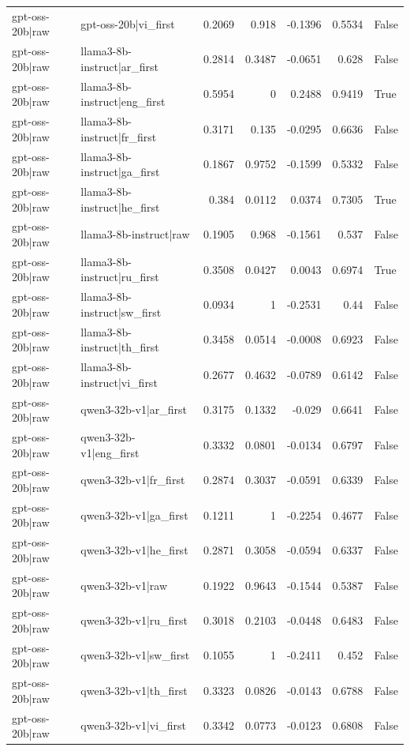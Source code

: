 \begin{table}
\begin{tabular}{l l r r r r l}
gpt-oss-20b|raw & gpt-oss-20b|vi_first & 0.2069 & 0.918 & -0.1396 & 0.5534 & False \\
gpt-oss-20b|raw & llama3-8b-instruct|ar_first & 0.2814 & 0.3487 & -0.0651 & 0.628 & False \\
gpt-oss-20b|raw & llama3-8b-instruct|eng_first & 0.5954 & 0 & 0.2488 & 0.9419 & True \\
gpt-oss-20b|raw & llama3-8b-instruct|fr_first & 0.3171 & 0.135 & -0.0295 & 0.6636 & False \\
gpt-oss-20b|raw & llama3-8b-instruct|ga_first & 0.1867 & 0.9752 & -0.1599 & 0.5332 & False \\
gpt-oss-20b|raw & llama3-8b-instruct|he_first & 0.384 & 0.0112 & 0.0374 & 0.7305 & True \\
gpt-oss-20b|raw & llama3-8b-instruct|raw & 0.1905 & 0.968 & -0.1561 & 0.537 & False \\
gpt-oss-20b|raw & llama3-8b-instruct|ru_first & 0.3508 & 0.0427 & 0.0043 & 0.6974 & True \\
gpt-oss-20b|raw & llama3-8b-instruct|sw_first & 0.0934 & 1 & -0.2531 & 0.44 & False \\
gpt-oss-20b|raw & llama3-8b-instruct|th_first & 0.3458 & 0.0514 & -0.0008 & 0.6923 & False \\
gpt-oss-20b|raw & llama3-8b-instruct|vi_first & 0.2677 & 0.4632 & -0.0789 & 0.6142 & False \\
gpt-oss-20b|raw & qwen3-32b-v1|ar_first & 0.3175 & 0.1332 & -0.029 & 0.6641 & False \\
gpt-oss-20b|raw & qwen3-32b-v1|eng_first & 0.3332 & 0.0801 & -0.0134 & 0.6797 & False \\
gpt-oss-20b|raw & qwen3-32b-v1|fr_first & 0.2874 & 0.3037 & -0.0591 & 0.6339 & False \\
gpt-oss-20b|raw & qwen3-32b-v1|ga_first & 0.1211 & 1 & -0.2254 & 0.4677 & False \\
gpt-oss-20b|raw & qwen3-32b-v1|he_first & 0.2871 & 0.3058 & -0.0594 & 0.6337 & False \\
gpt-oss-20b|raw & qwen3-32b-v1|raw & 0.1922 & 0.9643 & -0.1544 & 0.5387 & False \\
gpt-oss-20b|raw & qwen3-32b-v1|ru_first & 0.3018 & 0.2103 & -0.0448 & 0.6483 & False \\
gpt-oss-20b|raw & qwen3-32b-v1|sw_first & 0.1055 & 1 & -0.2411 & 0.452 & False \\
gpt-oss-20b|raw & qwen3-32b-v1|th_first & 0.3323 & 0.0826 & -0.0143 & 0.6788 & False \\
gpt-oss-20b|raw & qwen3-32b-v1|vi_first & 0.3342 & 0.0773 & -0.0123 & 0.6808 & False \\

\end{tabular}
\end{table}
